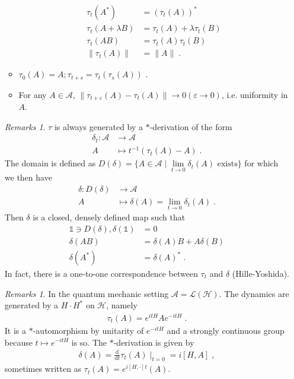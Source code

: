 \documentclass[
a4paper, %
11pt, %
onecolumn, %
openany, %
]{memoir}
\theoremstyle{definition}
\theoremstyle{remark}
\newtheorem{remarks}[definition]{Remarks}
\theoremstyle{plain}
\begin{document}
\begin{enumerate}
\begin{itemize}
\begin{align}
	\tau_t(A^*)&=(\tau_t(A))^*\\
	\tau_t(A+\lambda B)&=\tau_t(A)+\lambda\tau_t(B)\\
	\tau_t(AB)&=\tau_t(A)\tau_t(B)\\
	\|\tau_t(A)\|&=\|A\|\; .
	\end{align}
	\item $\tau_0(A)=A; \tau_{t+s}=\tau_t(\tau_s(A))$ \; .
	\item For any $A\in \mathcal{A}$, $\| \tau_{t+\varepsilon}(A)-\tau_{t}(A)\|\rightarrow 0 (\varepsilon \rightarrow 0)$, i.e. uniformity in $A$.
\end{itemize}
\begin{remarks}
	$\tau$ is always generated by a $*$-derivation of the form \begin{align}
	\delta_t:\mathcal{A}&\longrightarrow \mathcal{A}\\
	A&\longmapsto t^{-1}(\tau_t(A)-A)\; .
	\end{align}
	The domain is defined as $D(\delta)=\{A\in\mathcal{A} \mid \lim\limits_{t\rightarrow 0}\delta_t(A) \text{ exists}\}$ for which we then have \begin{align}
	\delta: D(\delta)&\longrightarrow \mathcal{A}\\
	A&\longmapsto \delta(A)=\lim_{t\rightarrow 0}\delta_t(A)\; .
	\end{align}
	Then $\delta$ is a closed, densely defined map such that \begin{align*}
	\mathds{1}\ni D(\delta), \delta(\mathds{1})&=0\\
							\delta(AB)&=\delta(A)B+A\delta(B)\\
							\delta(A^*)&=\delta(A)^*\;  .
	\end{align*}
	In fact, there is a one-to-one correspondence between $\tau_t$ and $\delta$ (Hille-Yoshida).
\end{remarks}
\begin{remarks}
	In the quantum mechanic setting $\mathcal{A}=\mathcal{L}(\mathcal{H})$. The dynamics are generated by a $H\cdot H^*$ on $\mathcal{H}$, namely \begin{align}
	\tau_t(A)=e^{itH}Ae^{-itH}\; .
	\end{align}
	It is a $*$-automorphism by unitarity of $e^{-itH}$ and a strongly continuous group because $t\mapsto e^{-itH}$ is so. The $*$-derivation is given by \begin{align*}
	\delta(A)=\frac{\mathrm{d}}{\mathrm{d}t}\tau_t(A)\mid_{t=0}=i[H,A]\; ,
	\end{align*}
	sometimes written as $\tau_t(A)=e^{i[H,\cdot]t}(A)$.

\end{remarks}
\end{enumerate}
\end{document}
